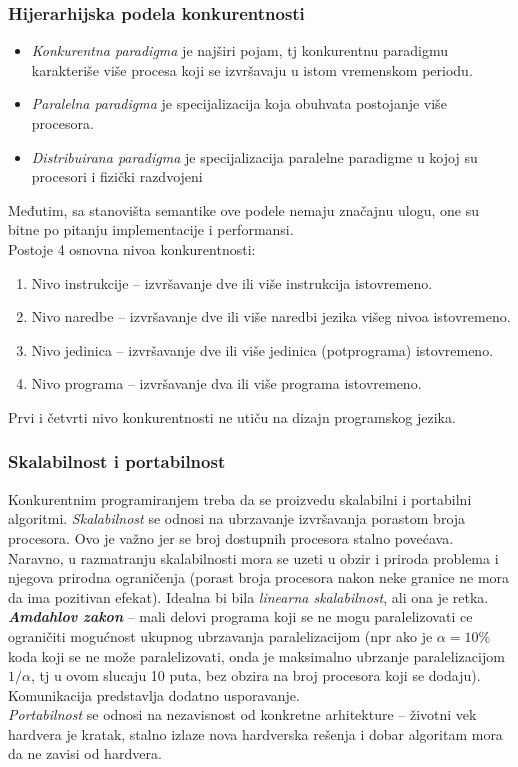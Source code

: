 \documentclass[../main.tex]{subfiles}
\begin{document}
\subsubsection{Hijerarhijska podela konkurentnosti}		%
\begin{itemize}
\item {\it Konkurentna paradigma} je najširi pojam, tj konkurentnu paradigmu karakteriše više procesa koji se izvršavaju u istom vremenskom periodu.
\item {\it Paralelna paradigma} je specijalizacija koja obuhvata postojanje više procesora.
\item {\it Distribuirana paradigma} je specijalizacija paralelne paradigme u kojoj su procesori i fizički razdvojeni
\end{itemize}

Međutim, sa stanovišta semantike ove podele nemaju značajnu ulogu, one su bitne po pitanju implementacije i performansi.
\\
Postoje 4 osnovna nivoa konkurentnosti:
\begin{enumerate}
\item Nivo instrukcije -- izvršavanje dve ili više instrukcija istovremeno.
\item Nivo naredbe -- izvršavanje dve ili više naredbi jezika višeg nivoa istovremeno.
\item Nivo jedinica -- izvršavanje dve ili više jedinica (potprograma) istovremeno.
\item Nivo programa -- izvršavanje dva ili više programa istovremeno.
\end{enumerate}
Prvi i četvrti nivo konkurentnosti ne utiču na dizajn programskog jezika.

\subsubsection{Skalabilnost i portabilnost}				%

Konkurentnim programiranjem treba da se proizvedu skalabilni i portabilni algoritmi. {\it Skalabilnost} se odnosi na ubrzavanje izvršavanja porastom broja procesora. Ovo je važno jer se broj dostupnih procesora stalno povećava. Naravno, u razmatranju skalabilnosti mora se uzeti u obzir i priroda problema i njegova prirodna ograničenja (porast broja procesora nakon neke granice ne mora da ima pozitivan efekat). Idealna bi bila {\it linearna skalabilnost}, ali ona je retka.
\\
{\it \bf Amdahlov zakon} -- mali delovi programa koji se ne mogu paralelizovati ce ograničiti mogućnost ukupnog ubrzavanja paralelizacijom (npr ako je $\alpha = 10\%$ koda koji se ne može paralelizovati, onda je maksimalno ubrzanje paralelizacijom $1/\alpha$, tj u ovom slucaju 10 puta, bez obzira na broj procesora koji se dodaju).
\\
Komunikacija predstavlja dodatno usporavanje.
\\
{\it Portabilnost} se odnosi na nezavisnost od konkretne arhitekture -- životni vek hardvera je kratak, stalno izlaze nova hardverska rešenja i dobar algoritam mora da ne zavisi od hardvera.
\end{document}
